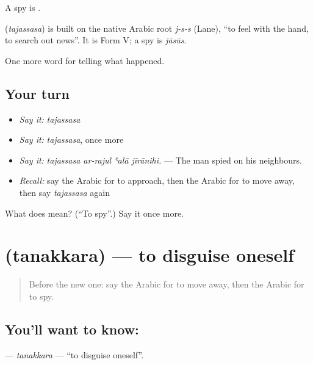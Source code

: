 A spy is .

\begin{cousinweb}
\textbf{} (\emph{tajassasa}) is built on the native Arabic root \emph{j-s-s} (Lane), \textquotedblleft{}to feel with the hand, to search out news\textquotedblright{}. It is Form V; a spy is \emph{jāsūs}.
\end{cousinweb}

\begin{grammarlens}[title={What you've built}]
One more word for telling what happened.
\end{grammarlens}

\subsection*{Your turn}
\begin{itemize}
\raggedright
  \item \emph{Say it:} \emph{tajassasa}
  \item \emph{Say it:} \emph{tajassasa}, once more
  \item \emph{Say it:} \emph{tajassasa ar-rajul ʿalā jīrānihi.} — The man spied on his neighbours.
  \item \emph{Recall:} say the Arabic for to approach, then the Arabic for to move away, then say \emph{tajassasa} again
\end{itemize}

\begin{tcolorbox}[breakable,colback=teal!4,colframe=teal!35!black,title={Before you move on}]
What does  mean? (\textquotedblleft{}To spy\textquotedblright{}.) Say it once more.
\end{tcolorbox}
\section[\texorpdfstring{\ar{تنكر} (tanakkara)}{تنكر (tanakkara)}]{ (tanakkara) — to disguise oneself}

\label{lesson:AR-C346-tanakkara}



\begin{quote}
Before the new one: say the Arabic for to move away, then the Arabic for to spy.
\end{quote}

\subsection*{You'll want to know: }
\textbf{} — \emph{tanakkara} — \textquotedblleft{}to disguise oneself\textquotedblright{}.

